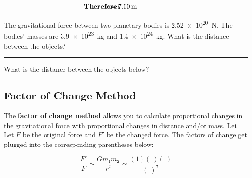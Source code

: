 \documentclass{article}
\begin{document}
\begin{align*}
    \hspace{-3.5em} & \textbf{Therefore:} & \hspace{-3em} &
    r = \SI{7.00}{m}
\end{align*}


\begin{exercise} \label{dKPTLZ}
The gravitational force between two planetary bodies is \SI{2.52e20}{N}. The bodies' masses are \SI{3.9e23}{kg} and \SI{1.4e24}{kg}. What is the distance between the objects?
\end{exercise}


\hrule

\begin{exercise} \label{zw3NbF}
What is the distance between the objects below?

\begin{center}
    \centering
\end{center}
\end{exercise}

\cyanhrule

\subsection{Factor of Change Method}

The \textbf{factor of change method} allows you to calculate proportional changes in the gravitational force with proportional changes in distance and/or mass. Let Let $F$ be the original force and $F'$ be the changed force. The factors of change get plugged into the corresponding parentheses below:

\begin{equation*}
    \frac{F'}{F} \sim \frac{G m_1 m_2}{r^2} \sim \frac{(1)(\ )(\ )}{(\ )^2}
\end{equation*}
\end{document}

